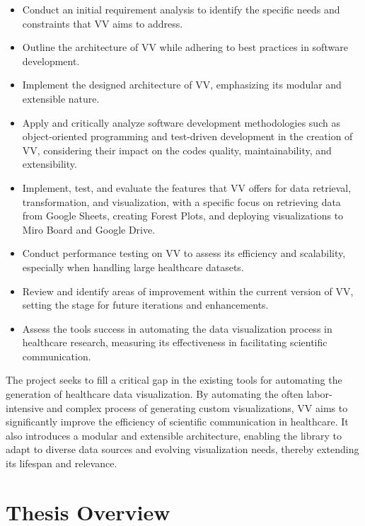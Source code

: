 \begin{itemize}
\item
  Conduct an initial requirement analysis to identify the specific needs
  and constraints that VV aims to address.
\item
  Outline the architecture of VV while adhering to best practices in
  software development.
\item
  Implement the designed architecture of VV, emphasizing its modular and
  extensible nature.
\item
  Apply and critically analyze software development methodologies such
  as object-oriented programming and test-driven development in the
  creation of VV, considering their impact on the code\textquotesingle s
  quality, maintainability, and extensibility.
\item
  Implement, test, and evaluate the features that VV offers for data
  retrieval, transformation, and visualization, with a specific focus on
  retrieving data from Google Sheets, creating Forest Plots, and
  deploying visualizations to Miro Board and Google Drive.
\item
  Conduct performance testing on VV to assess its efficiency and
  scalability, especially when handling large healthcare datasets.
\item
  Review and identify areas of improvement within the current version of
  VV, setting the stage for future iterations and enhancements.
\item
  Assess the tool\textquotesingle s success in automating the data
  visualization process in healthcare research, measuring its
  effectiveness in facilitating scientific communication.
\end{itemize}

The project seeks to fill a critical gap in the existing tools for
automating the generation of healthcare data visualization. By
automating the often labor-intensive and complex process of generating
custom visualizations, VV aims to significantly improve the efficiency
of scientific communication in healthcare. It also introduces a modular
and extensible architecture, enabling the library to adapt to diverse
data sources and evolving visualization needs, thereby extending its
lifespan and relevance.

\section{Thesis Overview}\label{thesis-overview}

